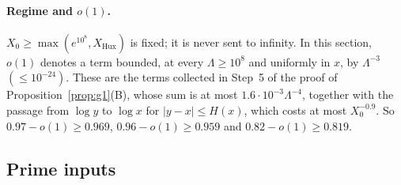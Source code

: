 \paragraph{Regime and $o(1)$.} $X_0\ge\max(e^{10^8},X_{\mathrm{Hux}})$ is fixed; it is never sent to infinity. In this
section, $o(1)$ denotes a term bounded, at every $\Lambda\ge10^8$ and uniformly in $x$, by $\Lambda^{-3}$ $(\le10^{-24})$.
These are the terms collected in Step~5 of the proof of Proposition~\ref{prop:g1}(B), whose sum is at most
$1.6\cdot10^{-3}\Lambda^{-4}$, together with the passage from $\log y$ to $\log x$ for $|y-x|\le H(x)$, which costs at most
$X_0^{-0.9}$. So $0.97-o(1)\ge0.969$, $0.96-o(1)\ge0.959$ and $0.82-o(1)\ge0.819$.

\subsection{Prime inputs}\label{sec:noise-primes}

